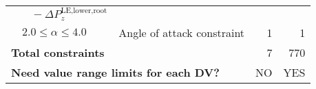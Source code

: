 \begin{table}[!t]
{\begin{tabular}{lllrr}
        \multicolumn{1}{l}{} &  $\;\;\;-\Delta P^{\text{LE,lower,root}}_z$ &        &        &  \\
        \multicolumn{1}{r}{} & $2.0 \leq \alpha \leq 4.0$ & Angle of attack constraint & 1      &  1 \\
        \hline
        \multicolumn{3}{l}{\textbf{Total constraints}} & 7      & 770 \\
        \hline
        \multicolumn{3}{l}{\textbf{Need value range limits for each DV?}} & NO     & YES \\
        \hline
        \end{tabular}%
    }
  \label{ch5:tab:crm_DV_cons}%
\end{table}%